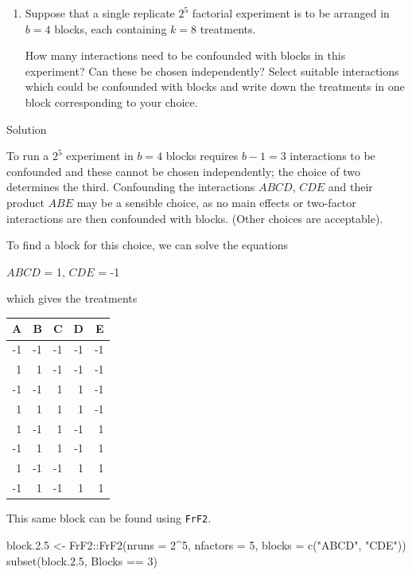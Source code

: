 \documentclass[
]{book}
\newenvironment{Shaded}{\begin{snugshade}}{\end{snugshade}}
\newcommand{\AttributeTok}[1]{\textcolor[rgb]{0.77,0.63,0.00}{#1}}
\newcommand{\DecValTok}[1]{\textcolor[rgb]{0.00,0.00,0.81}{#1}}
\newcommand{\FloatTok}[1]{\textcolor[rgb]{0.00,0.00,0.81}{#1}}
\newcommand{\FunctionTok}[1]{\textcolor[rgb]{0.00,0.00,0.00}{#1}}
\newcommand{\NormalTok}[1]{#1}
\newcommand{\OtherTok}[1]{\textcolor[rgb]{0.56,0.35,0.01}{#1}}
\newcommand{\SpecialCharTok}[1]{\textcolor[rgb]{0.00,0.00,0.00}{#1}}
\newcommand{\StringTok}[1]{\textcolor[rgb]{0.31,0.60,0.02}{#1}}
\theoremstyle{definition}
\theoremstyle{definition}
\theoremstyle{definition}
\theoremstyle{definition}
\theoremstyle{remark}
\begin{document}
\begin{enumerate}
\def\labelenumi{\arabic{enumi}.}
\item
  Suppose that a single replicate \(2^5\) factorial experiment is to be arranged in \(b=4\) blocks, each containing \(k=8\) treatments.

  How many interactions need to be confounded with blocks in this experiment? Can these be chosen independently? Select suitable interactions which could be confounded with blocks and write down the treatments in one block corresponding to your choice.
\end{enumerate}

Solution

To run a \(2^5\) experiment in \(b=4\) blocks requires \(b-1=3\) interactions to be confounded and these cannot be chosen independently; the choice of two determines the third.
Confounding the interactions \(ABCD\), \(CDE\) and their product \(ABE\) may be a sensible choice, as no main effects or two-factor interactions are then confounded with blocks. (Other choices are acceptable).

To find a block for this choice, we can solve the equations

\(ABCD\) = 1, \(CDE\) = -1

which gives the treatments

\begin{longtable}[]{@{}rrrrr@{}}
\toprule
A & B & C & D & E \\
\midrule
\endhead
-1 & -1 & -1 & -1 & -1 \\
1 & 1 & -1 & -1 & -1 \\
-1 & -1 & 1 & 1 & -1 \\
1 & 1 & 1 & 1 & -1 \\
1 & -1 & 1 & -1 & 1 \\
-1 & 1 & 1 & -1 & 1 \\
1 & -1 & -1 & 1 & 1 \\
-1 & 1 & -1 & 1 & 1 \\
\bottomrule
\end{longtable}

This same block can be found using \texttt{FrF2}.

\begin{Shaded}
\begin{Highlighting}[]
\NormalTok{block.}\FloatTok{2.5} \OtherTok{\textless{}{-}}\NormalTok{ FrF2}\SpecialCharTok{::}\FunctionTok{FrF2}\NormalTok{(}\AttributeTok{nruns =} \DecValTok{2}\SpecialCharTok{\^{}}\DecValTok{5}\NormalTok{, }\AttributeTok{nfactors =} \DecValTok{5}\NormalTok{, }\AttributeTok{blocks =} \FunctionTok{c}\NormalTok{(}\StringTok{"ABCD"}\NormalTok{, }\StringTok{"CDE"}\NormalTok{))}
\FunctionTok{subset}\NormalTok{(block.}\FloatTok{2.5}\NormalTok{, Blocks }\SpecialCharTok{==} \DecValTok{3}\NormalTok{)}
\end{Highlighting}
\end{Shaded}
\end{document}
